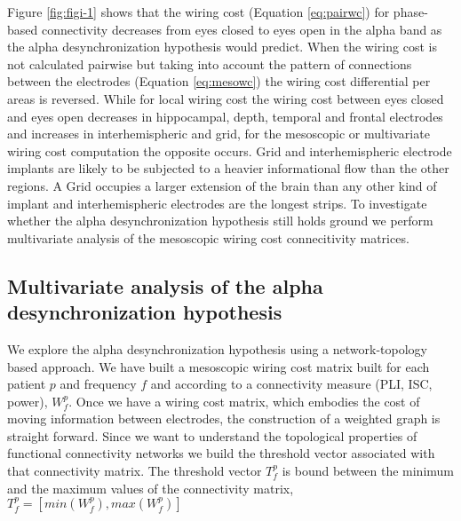 \documentclass[11pt, onecolumn]{article}
\begin{document}
Figure \ref{fig:figi-1} shows that the wiring cost (Equation \ref{eq:pairwc}) for phase-based connectivity decreases from eyes closed to eyes open in the alpha band as the alpha desynchronization hypothesis would predict.
When the wiring cost is not calculated pairwise but taking into account the pattern of connections between the electrodes (Equation \ref{eq:mesowc}) the wiring cost differential per areas is reversed. While for local wiring cost the wiring cost between eyes closed and eyes open decreases in hippocampal, depth, temporal and frontal electrodes and increases in interhemispheric and grid, for the mesoscopic or multivariate wiring cost computation the opposite occurs. 
Grid and interhemispheric electrode implants are likely to be subjected to a heavier informational flow than the other regions. A Grid occupies a larger extension of the brain than any other kind of implant and interhemispheric electrodes are the longest strips.  
To investigate whether the alpha desynchronization hypothesis still holds ground we perform multivariate analysis of the mesoscopic wiring cost connecitivity matrices.
 
\subsection{Multivariate analysis of the alpha desynchronization hypothesis}
We explore the alpha desynchronization hypothesis using a network-topology based approach. We have built a mesoscopic wiring cost matrix built for each patient $p$ and frequency $f$ and according to a connectivity measure (PLI, ISC, power), $W^p_{f}$. Once we have a wiring cost matrix, which embodies the cost of moving information between electrodes, the construction of a weighted graph is straight forward.
Since we want to understand the topological properties of functional connectivity networks we build the threshold vector associated with that connectivity matrix.
The threshold vector $T^p_{f}$ is bound between the minimum and the maximum values of the connectivity matrix, $T^p_{f} = [ min(W^p_{f}), max(W^p_{f}) ]$
 
\end{document}

